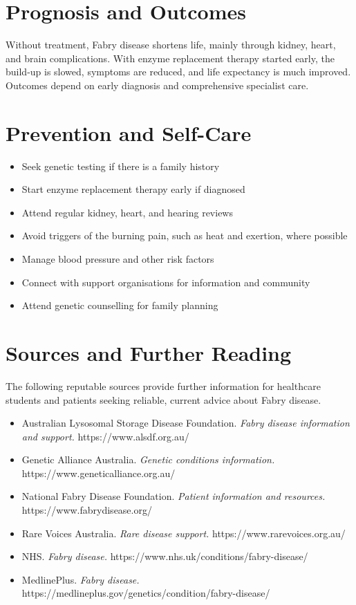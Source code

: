 \section*{Prognosis and Outcomes}
Without treatment, Fabry disease shortens life, mainly through kidney, heart, and brain complications. With enzyme replacement therapy started early, the build-up is slowed, symptoms are reduced, and life expectancy is much improved. Outcomes depend on early diagnosis and comprehensive specialist care.

\section*{Prevention and Self-Care}
\begin{itemize}
    \item Seek genetic testing if there is a family history
    \item Start enzyme replacement therapy early if diagnosed
    \item Attend regular kidney, heart, and hearing reviews
    \item Avoid triggers of the burning pain, such as heat and exertion, where possible
    \item Manage blood pressure and other risk factors
    \item Connect with support organisations for information and community
    \item Attend genetic counselling for family planning
\end{itemize}

\section*{Sources and Further Reading}
The following reputable sources provide further information for healthcare students and patients seeking reliable, current advice about Fabry disease.
\begin{itemize}
    \item Australian Lysosomal Storage Disease Foundation. \textit{Fabry disease information and support.} https://www.alsdf.org.au/
    \item Genetic Alliance Australia. \textit{Genetic conditions information.} https://www.geneticalliance.org.au/
    \item National Fabry Disease Foundation. \textit{Patient information and resources.} https://www.fabrydisease.org/
    \item Rare Voices Australia. \textit{Rare disease support.} https://www.rarevoices.org.au/
    \item NHS. \textit{Fabry disease.} https://www.nhs.uk/conditions/fabry-disease/
    \item MedlinePlus. \textit{Fabry disease.} https://medlineplus.gov/genetics/condition/fabry-disease/
\end{itemize}
